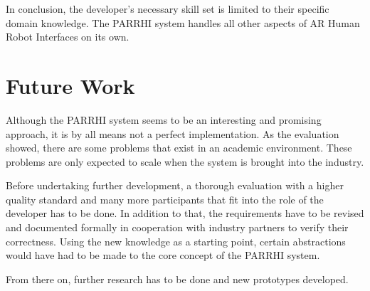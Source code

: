 In conclusion, the developer's necessary skill set is limited to their specific domain knowledge. The PARRHI system handles all other aspects of AR Human Robot Interfaces on its own.

\section{Future Work}\label{Section:FutureWork}

Although the PARRHI system seems to be an interesting and promising approach, it is by all means not a perfect implementation. As the evaluation showed, there are some problems that exist in an academic environment. These problems are only expected to scale when the system is brought into the industry. 

Before undertaking further development, a thorough evaluation with a higher quality standard and many more participants that fit into the role of the developer has to be done. In addition to that, the requirements have to be revised and documented formally in cooperation with industry partners to verify their correctness. Using the new knowledge as a starting point, certain abstractions would have had to be made to the core concept of the PARRHI system.

From there on, further research has to be done and new prototypes developed.











